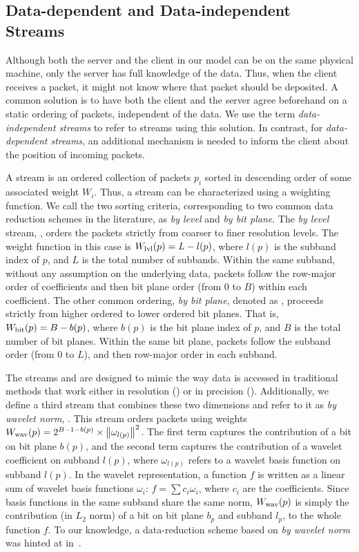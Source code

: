 \subsection{Data-dependent and Data-independent Streams} \label{sec:static-dynamic-streams}

Although both the server and the client in our model can be on the same physical machine, only the
server has full knowledge of the data. Thus, when the client receives a packet, it might not know
where that packet should be deposited. A common solution is to have both the client and the server
agree beforehand on a static ordering of packets, independent of the data. We use the term
\emph{data-independent streams} to refer to streams using this solution. In contrast, for
\emph{data-dependent streams}, an additional mechanism is needed to inform the client about the
position of incoming packets.

A stream is an ordered collection of packets $p_i$ sorted in descending order of some associated
weight $W_i$. Thus, a stream can be characterized using a weighting function. We call the two
sorting criteria, corresponding to two common data reduction schemes in the literature, as \emph{by
level} and \emph{by bit plane}.  The \emph{by level} stream, \slvl, orders the packets strictly from
coarser to finer resolution levels. The weight function in this case is $\wlvl(p)=L-l(p)$, where
$l(p)$ is the subband index of $p$, and $L$ is the total number of subbands. Within the same
subband, without any assumption on the underlying data, packets follow the row-major order of
coefficients and then bit plane order (from 0 to $B$) within each coefficient. The other common
ordering, \emph{by bit plane}, denoted as \sbit, proceeds strictly from higher ordered to lower
ordered bit planes. That is, $\wbit(p)=B-b(p)$, where $b(p)$ is the bit plane index of $p$, and $B$
is the total number of bit planes. Within the same bit plane, packets follow the subband order (from
0 to $L$), and then row-major order in each subband.

The streams \slvl and \sbit are designed to mimic the way data is accessed in traditional methods
that work either in resolution (\slvl) or in precision (\sbit). Additionally, we define a third
stream that combines these two dimensions and refer to it as \emph{by wavelet norm}, \swav.  This
stream orders packets using weights $\wwav(p)=2^{B-1-b(p)}\times \norm{\omega_{l(p)}}^2$. The first
term captures the contribution of a bit on bit plane $b(p)$, and the second term captures the
contribution of a wavelet coefficient on subband $l(p)$, where $\omega_{l(p)}$ refers to a wavelet
basis function on subband $l(p)$. In the wavelet representation, a function $f$ is written as a
linear sum of wavelet basis functions $\omega_i$: $f=\sum{c_i\omega_i}$, where $c_i$ are the
coefficients. Since basis functions in the same subband share the same norm, $\wwav(p)$ is simply
the contribution (in $L_2$ norm) of a bit on bit plane $b_p$ and subband $l_p$, to the whole
function $f$. To our knowledge, a data-reduction scheme based on \emph{by wavelet norm} was hinted
at in~\cite{weiss}.

